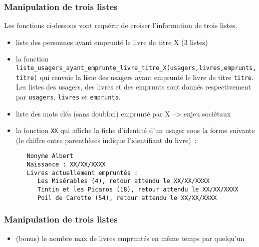 \documentclass[10pt,a4paper,onecolumn]{article}
\begin{document}
\subsubsection{Manipulation de trois listes}

Les fonctions ci-dessous vont requérir de croiser l'information de trois listes.

\begin{itemize}

\item liste des personnes ayant emprunté le livre de titre X (3 listes)
\item la fonction \texttt{liste\_usagers\_ayant\_emprunte\_livre\_titre\_X(usagers,livres,emprunts,titre)} qui renvoie la liste des usagers ayant emprunté le livre de titre \texttt{titre}. Les listes des usagers, des livres et des emprunts sont donnés respectivement par \texttt{usagers}, \texttt{livres} et \texttt{emprunts}.

\item liste des mots clés (sans doublon) emprunté par X --> enjeu sociétaux

\item la fonction \texttt{XX} qui affiche la fiche d'identité d'un usager sous la forme suivante (le chiffre entre parenthèses indique l'identifiant du livre)~:\\
\begin{verbatim}
   Nonyme Albert
   Naissance : XX/XX/XXXX
   Livres actuellement empruntés :
      Les Misérables (4), retour attendu le XX/XX/XXXX
      Tintin et les Picaros (18), retour attendu le XX/XX/XXXX
      Poil de Carotte (54), retour attendu le XX/XX/XXXX
\end{verbatim}



\end{itemize}


\subsubsection{Manipulation de trois listes}

\begin{itemize}

\item (bonus) le nombre max de livres empruntés en même temps par quelqu'un

\end{itemize}
\end{document}
